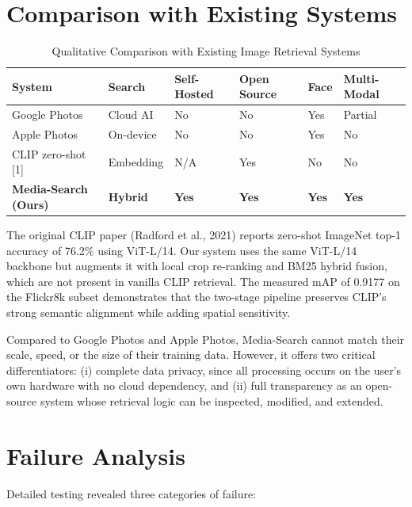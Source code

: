 \documentclass[12pt,a4paper,oneside]{report}
\begin{document}
\section{Comparison with Existing Systems}

\begin{table}[H]
\centering\small
\caption{Qualitative Comparison with Existing Image Retrieval Systems}
\label{tab:comparison}
\renewcommand{\arraystretch}{1.4}
\begin{tabular}{|p{2.6cm}|p{1.8cm}|p{1.5cm}|p{1.5cm}|p{1.5cm}|p{1.8cm}|}
\hline
\textbf{System} & \textbf{Search} & \textbf{Self-Hosted} & \textbf{Open Source} & \textbf{Face} & \textbf{Multi-Modal} \\
\hline
Google Photos & Cloud AI & No & No & Yes & Partial \\
\hline
Apple Photos & On-device & No & No & Yes & No \\
\hline
CLIP zero-shot [1] & Embedding & N/A & Yes & No & No \\
\hline
\textbf{Media-Search (Ours)} & \textbf{Hybrid} & \textbf{Yes} & \textbf{Yes} & \textbf{Yes} & \textbf{Yes} \\
\hline
\end{tabular}
\end{table}

The original CLIP paper (Radford et al., 2021) reports zero-shot ImageNet top-1 accuracy of 76.2\% using ViT-L/14. Our system uses the same ViT-L/14 backbone but augments it with local crop re-ranking and BM25 hybrid fusion, which are not present in vanilla CLIP retrieval. The measured mAP of 0.9177 on the Flickr8k subset demonstrates that the two-stage pipeline preserves CLIP's strong semantic alignment while adding spatial sensitivity.

Compared to Google Photos and Apple Photos, Media-Search cannot match their scale, speed, or the size of their training data. However, it offers two critical differentiators: (i) complete data privacy, since all processing occurs on the user's own hardware with no cloud dependency, and (ii) full transparency as an open-source system whose retrieval logic can be inspected, modified, and extended.

\section{Failure Analysis}

Detailed testing revealed three categories of failure:
\end{document}
